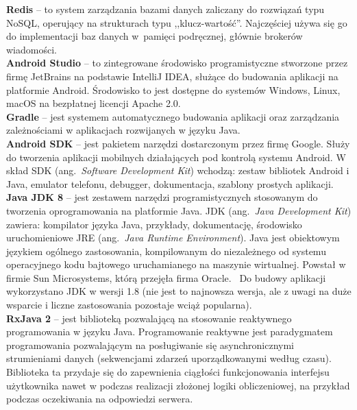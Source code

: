 \noindent\textbf{Redis} -- to system zarządzania bazami danych zaliczany do rozwiązań typu NoSQL, operujący na strukturach typu ,,klucz-wartość''. 
Najczęściej używa się go do implementacji baz danych w~pamięci podręcznej, głównie brokerów wiadomości.~\cite{redis} \\

\noindent\textbf{Android Studio} -- to zintegrowane środowisko programistyczne stworzone przez firmę JetBrains na podstawie IntelliJ IDEA, służące do budowania aplikacji na platformie Android. Środowisko to jest dostępne do systemów Windows, Linux, macOS na bezpłatnej licencji Apache 2.0.~\cite{android_doc,android_studio} \\

\noindent\textbf{Gradle} -- jest systemem automatycznego budowania aplikacji oraz zarządzania zależnościami w aplikacjach rozwijanych w języku Java.~\cite{gradle,gradle_android_doc} \\

\noindent\textbf{Android SDK} -- jest pakietem narzędzi dostarczonym przez firmę Google. Służy do tworzenia aplikacji mobilnych działających pod kontrolą systemu Android. W skład SDK (ang.~\emph{Software Development Kit}) wchodzą: zestaw bibliotek Android i Java, emulator telefonu, debugger, dokumentacja, szablony prostych aplikacji.~\cite{android_studio} \\

\noindent\textbf{Java JDK 8} -- jest zestawem narzędzi programistycznych stosowanym do tworzenia oprogramowania na platformie Java. JDK (ang.~\emph{Java Development Kit}) zawiera: kompilator języka Java, przykłady, dokumentację, środowisko uruchomieniowe JRE (ang.~\emph{Java Runtime Environment}).
Java jest obiektowym językiem ogólnego zastosowania, kompilowanym do niezależnego od systemu operacyjnego kodu bajtowego uruchamianego na maszynie wirtualnej. Powstał w firmie Sun Microsystems, którą przejęła firma Oracle.~\cite{java_doc} 
Do budowy aplikacji wykorzystano JDK w wersji 1.8 (nie jest to najnowsza wersja, ale z uwagi na duże wsparcie i liczne zastosowania pozostaje wciąż popularna). \\

\noindent\textbf{RxJava 2} -- jest biblioteką pozwalającą na stosowanie reaktywnego programowania w języku Java. Programowanie reaktywne jest paradygmatem programowania pozwalającym na posługiwanie się asynchronicznymi strumieniami danych (sekwencjami zdarzeń uporządkowanymi według czasu).
Biblioteka ta przydaje się do zapewnienia ciągłości funkcjonowania interfejsu użytkownika nawet w podczas realizacji złożonej logiki obliczeniowej, na przykład podczas oczekiwania na odpowiedzi serwera. \\

